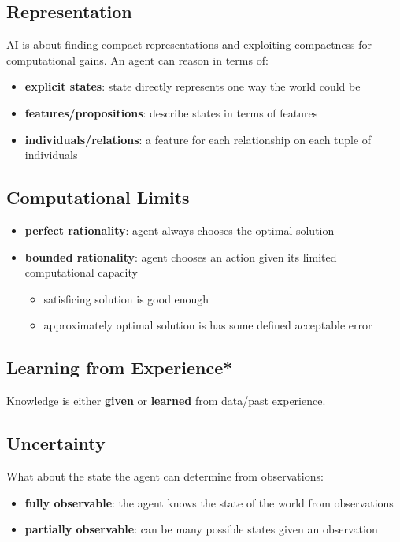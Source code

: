 \documentclass[11pt]{article}
\begin{document}
\subsection{Representation}
\label{sec:org8b317d3}
AI is about finding compact representations and exploiting compactness for computational gains.
An agent can reason in terms of:
\begin{itemize}
\item \textbf{explicit states}: state directly represents one way the world could be
\item \textbf{features/propositions}: describe states in terms of features
\item \textbf{individuals/relations}: a feature for each relationship on each tuple of individuals
\end{itemize}
\subsection{Computational Limits}
\label{sec:org6bc176d}
\begin{itemize}
\item \textbf{perfect rationality}: agent always chooses the optimal solution
\item \textbf{bounded rationality}: agent chooses an action given its limited computational capacity
\begin{itemize}
\item satisficing solution is good enough
\item approximately optimal solution is has some defined acceptable error
\end{itemize}
\end{itemize}
\subsection{Learning from Experience*}
\label{sec:org8444819}
Knowledge is either \textbf{given} or \textbf{learned} from data/past experience.
\subsection{Uncertainty}
\label{sec:orgcc4b048}
What about the state the agent can determine from observations:
\begin{itemize}
\item \textbf{fully observable}: the agent knows the state of the world from observations
\item \textbf{partially observable}: can be many possible states given an observation
\end{itemize}
\end{document}
